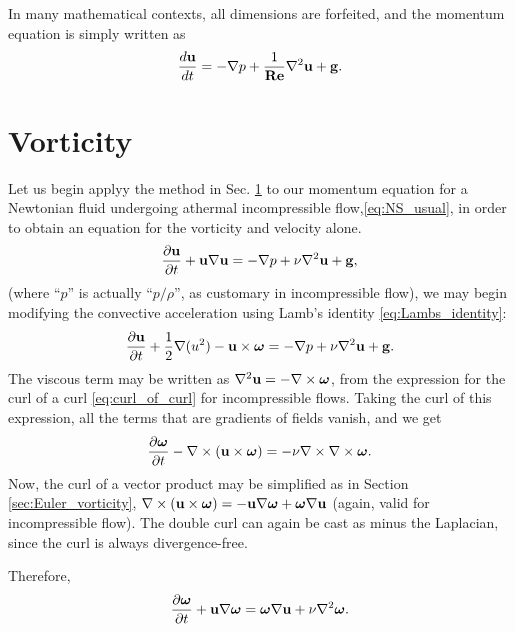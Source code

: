 In many mathematical contexts, all dimensions are forfeited, and the
momentum equation is simply written as
\begin{equation}
  \label{eq:NS_usual_reduced}
  \frac{d\mathbf{u} }{dt} =
  - \nabla p 
  + \frac{1}{\mathbf{Re}} \nabla^2 \mathbf{u}
  + \mathbf{g} .
\end{equation}







\section{Vorticity}
\label{sec:NS_vort}

Let us begin applyy the method in Sec. \ref{sec:NS_vort} to our
momentum equation for a Newtonian fluid undergoing athermal
incompressible flow,\ref{eq:NS_usual}, in order to obtain an equation
for the vorticity and velocity alone.
\begin{equation*}
  \frac{\partial \mathbf{u} }{\partial t}
  + \mathbf{u} \nabla \mathbf{u}
  =
  - \nabla p 
  + \nu \nabla^2 \mathbf{u}
  + \mathbf{g} ,
\end{equation*}
(where ``$p$'' is actually ``$p/\rho$'', as customary in
incompressible flow), we may begin modifying the convective
acceleration using Lamb's identity \ref{eq:Lambs_identity}:
\begin{equation*}
  \frac{\partial \mathbf{u} }{\partial t}
  + \frac12 \nabla (u^2)
  -\mathbf{u}\times\bm{\omega}
  =
  - \nabla p 
  + \nu \nabla^2 \mathbf{u}
  + \mathbf{g} .
\end{equation*}
The viscous term may be written as
$\nabla^2 \mathbf{u} = -\nabla\times\bm{\omega}$, from the expression for the curl
of a curl \ref{eq:curl_of_curl} for incompressible flows. Taking the
curl of this expression, all the terms that are gradients of fields
vanish, and we get
\begin{equation*}
  \frac{\partial \bm{\omega} }{\partial t}
  -\nabla\times (\mathbf{u} \times \bm{\omega} )
  =
  -\nu  \nabla\times\nabla\times\bm{\omega} .
\end{equation*}
Now, the curl of a vector product may be simplified as in Section
\ref{sec:Euler_vorticity}, $\nabla\times (\mathbf{u} \times \bm{\omega} ) =
-\mathbf{u}\nabla\bm{\omega} + \bm{\omega}\nabla\mathbf{u}$ (again, valid for incompressible
flow). The double curl can again be cast as minus the Laplacian, since
the curl is always divergence-free.

Therefore,
\begin{equation*}
  \frac{\partial \bm{\omega} }{\partial t} +
  \mathbf{u}\nabla\bm{\omega} 
  =
  \bm{\omega}\nabla\mathbf{u}
  +\nu  \nabla^2\bm{\omega} .
\end{equation*}

